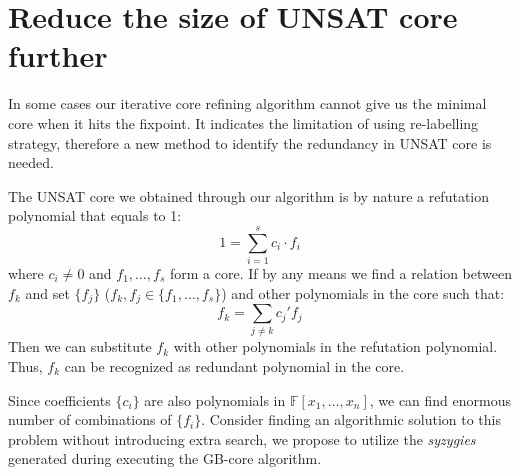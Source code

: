 \section{Reduce the size of UNSAT core further}
In some
cases our iterative core refining algorithm cannot
give us the minimal core when it hits the fixpoint.
It indicates the limitation of using re-labelling 
strategy, therefore a new method to identify the 
redundancy in UNSAT core is needed.

The UNSAT core we obtained through our algorithm
is by nature a refutation polynomial that equals to 1:
$$1 = \sum_{i=1}^s c_i\cdot f_i$$
where $c_i \neq 0$ and $f_1,\dots,f_s$ form a core.
If by any means we find a relation between $f_k$ and set $\{f_j\}$
 ($f_k,f_j\in \{f_1,\dots,f_s\}$) and other polynomials
 in the core such that:
 $$f_k = \sum_{j\neq k} c_j'f_j$$
 Then we can substitute $f_k$ with other polynomials
 in the refutation polynomial. Thus, $f_k$ can be
 recognized as redundant polynomial in the core.
 
 Since coefficients $\{c_i\}$ are also polynomials in $\mathbb F[x_1,\dots,x_n]$, we can find 
 enormous number of combinations of $\{f_i\}$. Consider finding an algorithmic solution to 
 this problem without introducing extra search,
 we propose to utilize the \emph{syzygies} generated during
 executing the GB-core algorithm.
 

